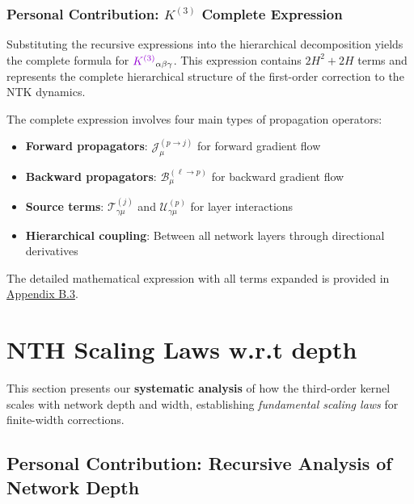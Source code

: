 \documentclass[a4paper]{article}
\theoremstyle{plain}
\theoremstyle{definition}
\theoremstyle{remark}
\begin{document}
\subsubsection{Personal Contribution: $K^{(3)}$ Complete Expression}

Substituting the recursive expressions into the hierarchical decomposition yields the complete formula for $\textcolor{k3color}{K^{(3)}}_{\alpha\beta\gamma}$. This expression contains $2H^2 + 2H$ terms and represents the complete hierarchical structure of the first-order correction to the NTK dynamics.

\begin{tcolorbox}[colback=orange!10,colframe=orange!60!black,title={\textbf{Complete Formula Structure}},enhanced,drop shadow]
The complete expression involves four main types of propagation operators:
\begin{itemize}
\item \textbf{Forward propagators}: $\mathcal{J}^{(p \to j)}_{\mu}$ for forward gradient flow
\item \textbf{Backward propagators}: $\mathcal{B}^{(\ell \to p)}_{\mu}$ for backward gradient flow  
\item \textbf{Source terms}: $\mathcal{T}^{(j)}_{\gamma\mu}$ and $\mathcal{U}^{(p)}_{\gamma\mu}$ for layer interactions
\item \textbf{Hierarchical coupling}: Between all network layers through directional derivatives
\end{itemize}
\end{tcolorbox}

The detailed mathematical expression with all terms expanded is provided in \hyperref[sec:appendix_complete_expression]{Appendix B.3}.







\newpage


\section{NTH Scaling Laws w.r.t depth}

This section presents our \textbf{systematic analysis} of how the third-order kernel scales with network depth and width, establishing \textit{fundamental scaling laws} for finite-width corrections.


\subsection{Personal Contribution: Recursive Analysis of Network Depth}
\end{document}
